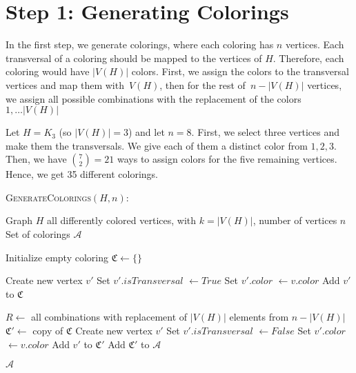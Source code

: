 \section{Step 1: Generating Colorings}
In the first step, we generate colorings, where each coloring has \(n\) vertices.
Each transversal of a coloring should be mapped to the vertices of $H$. Therefore, each coloring would have $|V(H)|$ colors.
First, we assign the colors to the transversal vertices and map them with~$V(H)$, then for the rest of~$n - |V(H)|$ vertices, 
we assign all possible combinations with the replacement of the colors~$1, \dots |V(H)|$ 
\begin{example}
 Let \(H = K_3\) (so \( |V(H)| = 3 \)) and let \(n = 8\). 
 First, we select three vertices and make them the transversals. We give each of them a distinct color from $1, 2, 3$.
 Then, we have $\binom{7}{2} = 21$ ways to assign colors for the five remaining vertices. Hence, we get 35 different colorings.
\end{example}


\begin{algorithm}[H]
    \caption{\textsc{GenerateColorings}$(H, n)$:}
    \label{alg:balanced-coloring}
    \begin{algorithmic}[1]
    \Require Graph $H$ all differently colored vertices, with $k = |V(H)|$, number of vertices $n$
    \Ensure Set of colorings $\mathcal{A}$

    \State Initialize empty coloring $\mathfrak{C} \gets \{\}$
    
        \State Create new vertex $v'$
        \State Set $v'.isTransversal$ $\gets True$
        \State Set $v'.color$  $\gets v.color$
        \State Add $v'$ to $\mathfrak{C}$
    \EndFor
    

        \State $R \gets$ all combinations with replacement of $|V(H)|$ elements from $n - |V(H)|$
            \State $\mathfrak{C}' \gets$ copy of $\mathfrak{C}$
                \State Create new vertex $v'$
                \State Set $v'.isTransversal$ $\gets False$
                \State Set $v'.color$  $\gets v.color$
                \State Add $v'$ to $\mathfrak{C}'$
            \EndFor
            \State Add $\mathfrak{C}'$ to $\mathcal{A}$
        \EndFor
    
    \State \Return $\mathcal{A}$
    \end{algorithmic}
\end{algorithm}
    
